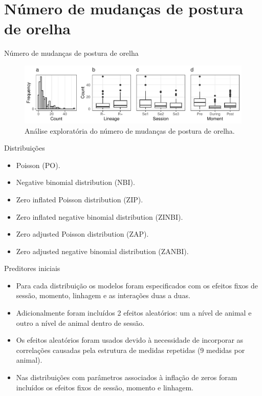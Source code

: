 \documentclass[
  ignorenonframetext,
  serif,
  professionalfont,
  usenames,
  dvipsnames,
  aspectratio = 169]{beamer}
\providecommand{\tightlist}{%
  \setlength{\itemsep}{0pt}\setlength{\parskip}{0pt}}
\renewcommand{\tightlist}{%
  \setlength{\itemsep}{0\baselineskip}
  \setlength{\parskip}{0.25\baselineskip}
}
\begin{document}
\hypertarget{nuxfamero-de-mudanuxe7as-de-postura-de-orelha}{%
\section{Número de mudanças de postura de
orelha}\label{nuxfamero-de-mudanuxe7as-de-postura-de-orelha}}

\begin{frame}{Número de mudanças de postura de orelha}
\protect\hypertarget{nuxfamero-de-mudanuxe7as-de-postura-de-orelha-1}{}
\begin{figure}

{\centering \includegraphics[width=0.95\linewidth]{./img/count} 

}

\caption{Análise exploratória do número de mudanças de postura de orelha.}\label{fig:unnamed-chunk-10}
\end{figure}
\end{frame}

\begin{frame}{Distribuições}
\protect\hypertarget{distribuiuxe7uxf5es}{}
\begin{itemize}
\tightlist
\item
  Poisson (PO).
\item
  Negative binomial distribution (NBI).
\item
  Zero inflated Poisson distribution (ZIP).
\item
  Zero inflated negative binomial distribution (ZINBI).
\item
  Zero adjusted Poisson distribution (ZAP).
\item
  Zero adjusted negative binomial distribution (ZANBI).
\end{itemize}
\end{frame}

\begin{frame}{Preditores iniciais}
\protect\hypertarget{preditores-iniciais}{}
\begin{itemize}
\item
  Para cada distribuição os modelos foram especificados com os efeitos
  fixos de sessão, momento, linhagem e as interações duas a duas.
\item
  Adicionalmente foram incluídos 2 efeitos aleatórios: um a nível de
  animal e outro a nível de animal dentro de sessão.
\item
  Os efeitos aleatórios foram usados devido à necessidade de incorporar
  as correlações causadas pela estrutura de medidas repetidas (9 medidas
  por animal).
\item
  Nas distribuições com parâmetros associados à inflação de zeros foram
  incluídos os efeitos fixos de sessão, momento e linhagem.
\end{itemize}
\end{frame}
\end{document}
